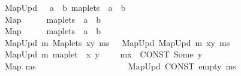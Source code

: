 \begin{isabellebody}
\ \ {\isachardoublequoteopen}{\isacharunderscore}MapUpd{\isachardoublequoteclose}\ \ {\isacharcolon}{\isacharcolon}\ {\isachardoublequoteopen}{\isacharbrackleft}{\isacharprime}a\ {\isasymrightharpoonup}\ {\isacharprime}b{\isacharcomma}\ maplets{\isacharbrackright}\ {\isasymRightarrow}\ {\isacharprime}a\ {\isasymrightharpoonup}\ {\isacharprime}b{\isachardoublequoteclose}\ {\isacharparenleft}{\isachardoublequoteopen}{\isacharunderscore}{\isacharslash}{\isacharprime}{\isacharparenleft}{\isacharunderscore}{\isacharprime}{\isacharparenright}{\isachardoublequoteclose}\ {\isacharbrackleft}{}{}{}{\isacharcomma}\ {}{\isacharbrackright}\ {}{}{}{\isacharparenright}\isanewline
\ \ {\isachardoublequoteopen}{\isacharunderscore}Map{\isachardoublequoteclose}\ \ \ \ \ {\isacharcolon}{\isacharcolon}\ {\isachardoublequoteopen}maplets\ {\isasymRightarrow}\ {\isacharprime}a\ {\isasymrightharpoonup}\ {\isacharprime}b{\isachardoublequoteclose}\ \ \ \ \ \ \ \ \ \ \ \ {\isacharparenleft}{\isachardoublequoteopen}{\isacharparenleft}{}{\isacharbrackleft}{\isacharunderscore}{\isacharbrackright}{\isacharparenright}{\isachardoublequoteclose}{\isacharparenright}\isanewline
\ \ {\isachardoublequoteopen}{\isacharunderscore}Map{\isachardoublequoteclose}\ \ \ \ \ {\isacharcolon}{\isacharcolon}\ {\isachardoublequoteopen}maplets\ {\isasymRightarrow}\ {\isacharprime}a\ {\isasymrightharpoonup}\ {\isacharprime}b{\isachardoublequoteclose}\ \ \ \ \ \ \ \ \ \ \ \ {\isacharparenleft}{\isachardoublequoteopen}{\isacharparenleft}{}{\isacharless}{\isacharunderscore}{\isachargreater}{\isacharparenright}{\isachardoublequoteclose}{\isacharparenright}\isanewline
\isanewline
{}\isamarkupfalse%
\isanewline
\ \ {\isachardoublequoteopen}{\isacharunderscore}MapUpd\ m\ {\isacharparenleft}{\isacharunderscore}Maplets\ xy\ ms{\isacharparenright}{\isachardoublequoteclose}\ \ {\isasymrightleftharpoons}\ {\isachardoublequoteopen}{\isacharunderscore}MapUpd\ {\isacharparenleft}{\isacharunderscore}MapUpd\ m\ xy{\isacharparenright}\ ms{\isachardoublequoteclose}\isanewline
\ \ {\isachardoublequoteopen}{\isacharunderscore}MapUpd\ m\ {\isacharparenleft}{\isacharunderscore}maplet\ \ x\ y{\isacharparenright}{\isachardoublequoteclose}\ \ \ \ {\isasymrightleftharpoons}\ {\isachardoublequoteopen}m{\isacharparenleft}x\ {\isachardollar}{\isacharcolon}{\isacharequal}\ CONST\ Some\ y{\isacharparenright}{\isachardoublequoteclose}\isanewline
\ \ {\isachardoublequoteopen}{\isacharunderscore}Map\ ms{\isachardoublequoteclose}\ \ \ \ \ \ \ \ \ \ \ \ \ \ \ \ \ \ \ \ \ {\isasymrightleftharpoons}\ {\isachardoublequoteopen}{\isacharunderscore}MapUpd\ {\isacharparenleft}CONST\ empty{\isacharparenright}\ ms{\isachardoublequoteclose}\isanewline

\end{isabellebody}
